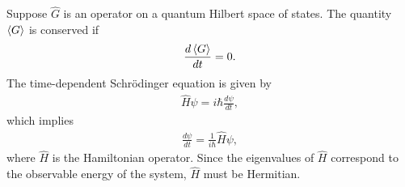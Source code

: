     Suppose $\hat{G}$ is an operator on a quantum Hilbert space of states. The quantity $\braket{G}$ is conserved if
    \begin{align}
        \frac{d\braket{G}}{dt} = 0.
    \end{align}
    The time-dependent Schr\"odinger equation is given by
    \begin{align}
        \hat{H}\psi = i\hbar\frac{d\psi}{dt},
    \end{align}
    which implies
    \begin{align}
        \frac{d\psi}{dt} = \frac{1}{i\hbar}\hat{H}\psi,
    \end{align}
    where $\hat{H}$ is the Hamiltonian operator. Since the eigenvalues of $\hat{H}$ correspond to the observable energy of the system, $\hat{H}$ must be Hermitian.

